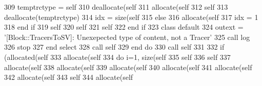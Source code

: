 \begin{DoxyCode}
309                         temptrctype = self%
310                         \textcolor{keyword}{deallocate}(self%
311                         \textcolor{keyword}{allocate}(self%
312                         self%
313                         \textcolor{keyword}{deallocate}(temptrctype)
314                         idx = \textcolor{keyword}{size}(self%
315                     \textcolor{keywordflow}{else}
316                         \textcolor{keyword}{allocate}(self%
317                         idx = 1
318 \textcolor{keywordflow}{                    end if}
319                     self%
320                     self%
321                     self%
322 \textcolor{keywordflow}{                end if}
323 \textcolor{keywordflow}{            class default}
324             outext = \textcolor{stringliteral}{'[Block::TracersToSV]: Unexepected type of content, not a Tracer'}
325             \textcolor{keyword}{call }log%
326             stop
327 \textcolor{keywordflow}{        end select}
328         \textcolor{keyword}{call }self%
329 \textcolor{keywordflow}{    end do}
330     \textcolor{keyword}{call }self%
331     
332     \textcolor{keywordflow}{if} (\textcolor{keyword}{allocated}(self%
333         \textcolor{keyword}{allocate}(self%
334         \textcolor{keywordflow}{do} i=1, \textcolor{keyword}{size}(self%
335             self%
336             self%
337             \textcolor{keyword}{allocate}(self%
338             \textcolor{keyword}{allocate}(self%
339             \textcolor{keyword}{allocate}(self%
340             \textcolor{keyword}{allocate}(self%
341             \textcolor{keyword}{allocate}(self%
342             \textcolor{keyword}{allocate}(self%
343             self%
344             \textcolor{keyword}{allocate}(self%

\end{DoxyCode}

